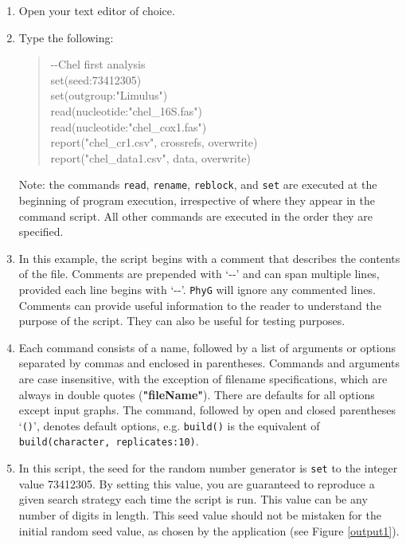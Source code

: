 \documentclass[]{article}
\newcommand{\phyg}{\texttt{PhyG} }
\begin{document}
\begin{enumerate}

\item Open your text editor of choice.

\item Type the following:
	
	\begin{quote}
	-\/-Chel first analysis\\
	set(seed:73412305)\\
	set(outgroup:"Limulus")\\
	read(nucleotide:"chel\_16S.fas")\\
	read(nucleotide:"chel\_cox1.fas")\\
	report("chel\_cr1.csv", crossrefs, overwrite)\\
	report("chel\_data1.csv", data, overwrite)\\
	\end{quote}

Note: the commands \texttt{read}, \texttt{rename}, \texttt{reblock}, and \texttt{set} 
are executed at the beginning of program execution, irrespective of where they 
appear in the command script. All other commands are executed in the order they 
are specified.

\item In this example, the script begins with a comment that describes the 
contents of the file. Comments are prepended with `-{}-' and can span multiple 
lines, provided each line begins with `-{}-'. \phyg will ignore any commented 
lines. Comments can provide useful information to the reader to understand 
the purpose of the script. They can also be useful for testing purposes.

\item Each command consists of a name, followed by a list of arguments or options 
separated by commas and enclosed in parentheses. Commands and arguments are 
case insensitive, with the exception of filename specifications, which are always in 
double quotes (\textbf{"fileName"}). There are defaults for all options except 
input graphs. The command, followed by open and closed parentheses `\texttt{()}',
denotes default options, e.g. \texttt{build()} is the equivalent of \texttt{build(character, 
replicates:10)}.

\item In this script, the seed for the random number generator is \texttt{set} to 
the integer value 73412305. By setting this value, you are guaranteed to reproduce 
a given search strategy each time the script is run. This value can be any number of 
digits in length. This seed value should not be mistaken for the initial random
seed value, as chosen by the application (see Figure \ref{output1}).


\end{enumerate}
\end{document}
